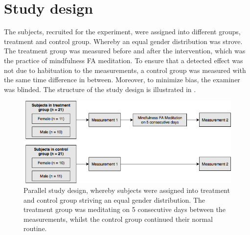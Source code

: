 \vspace{-.5cm}

\section{Study design} 

The subjects, recruited for the experiment, were assigned into different groups, treatment and control group. Whereby an equal gender distribution was strove. The treatment group was measured before and after the intervention, which was the practice of mindfulness FA meditation. To ensure that a detected effect was not due to habituation to the measurements, a control group was measured with the same time difference in between. Moreover, to minimize bias, the examiner was blinded. The structure of the study design is illustrated in .

\begin{figure}[H]
	\includegraphics[width=1\textwidth]{figures/studydesign.png} 
	\caption{Parallel study design, whereby subjects were assigned into treatment and control group striving an equal gender distribution. The treatment group was meditating on 5 consecutive days between the measurements, whilst the control group continued their normal routine.}
	\label{fig:studydesign}  
\end{figure}  

